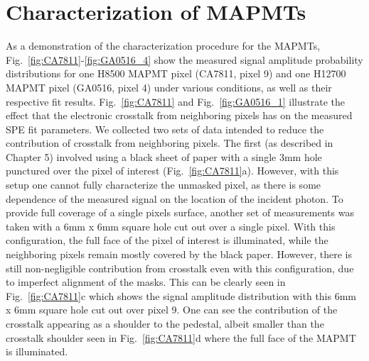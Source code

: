\section{Characterization of MAPMTs}

As a demonstration of the characterization procedure for the MAPMTs, Fig.~\ref{fig:CA7811}-\ref{fig:GA0516_4} show the measured signal amplitude probability distributions for one H8500 MAPMT pixel (CA7811, pixel 9) and one H12700 MAPMT pixel (GA0516, pixel 4) under various conditions, as well as their respective fit results. 
Fig.~\ref{fig:CA7811} and Fig.~\ref{fig:GA0516_1} illustrate the effect that the electronic crosstalk from neighboring pixels has on the measured SPE fit parameters. 
We collected two sets of data intended to reduce the contribution of crosstalk from neighboring pixels. 
The first (as described in Chapter 5) involved using a black sheet of paper with a single 3mm hole punctured over the pixel of interest (Fig.~\ref{fig:CA7811}a). 
However, with this setup one cannot fully characterize the unmasked pixel, as there is some dependence of the measured signal on the location of the incident photon. 
To provide full coverage of a single pixel\textquotesingle s surface, another set of measurements was taken with a 6mm x 6mm square hole cut out over a single pixel. 
With this configuration, the full face of the pixel of interest is illuminated, while the neighboring pixels remain mostly covered by the black paper. 
However, there is still non-negligible contribution from crosstalk even with this configuration, due to imperfect alignment of the masks. 
This can be clearly seen in Fig.~\ref{fig:CA7811}c which shows the signal amplitude distribution with this 6mm x 6mm square hole cut out over pixel 9. 
One can see the contribution of the crosstalk appearing as a shoulder to the pedestal, albeit smaller than the crosstalk shoulder seen in Fig.~\ref{fig:CA7811}d where the full face of the MAPMT is illuminated. 

